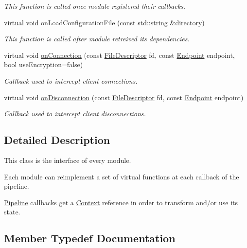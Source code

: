\begin{DoxyCompactItemize}
\begin{DoxyCompactList}\small\item\em This function is called once module registered their callbacks. \end{DoxyCompactList}\item 
virtual void \mbox{\hyperlink{classo_z_1_1_i_module_a61a2cc76594401ed2f50931a6a6b76f3}{on\+Load\+Configuration\+File}} (const std\+::string \&directory)
\begin{DoxyCompactList}\small\item\em This function is called after module retreived its dependencies. \end{DoxyCompactList}\item 
virtual void \mbox{\hyperlink{classo_z_1_1_i_module_a8acf56655f9e59a8a04afd8b0adf79d6}{on\+Connection}} (const \mbox{\hyperlink{namespaceo_z_acbb8d05709257b6414b3979597f88c0c}{File\+Descriptor}} fd, const \mbox{\hyperlink{classo_z_1_1_endpoint}{Endpoint}} endpoint, bool use\+Encryption=false)
\begin{DoxyCompactList}\small\item\em Callback used to intercept client connections. \end{DoxyCompactList}\item 
virtual void \mbox{\hyperlink{classo_z_1_1_i_module_aa178220a4e7ba0cca50a131403e04847}{on\+Disconnection}} (const \mbox{\hyperlink{namespaceo_z_acbb8d05709257b6414b3979597f88c0c}{File\+Descriptor}} fd, const \mbox{\hyperlink{classo_z_1_1_endpoint}{Endpoint}} endpoint)
\begin{DoxyCompactList}\small\item\em Callback used to intercept client disconnections. \end{DoxyCompactList}\end{DoxyCompactItemize}


\subsection{Detailed Description}
This class is the interface of every module. 

Each module can reimplement a set of virtual functions at each callback of the pipeline.

\mbox{\hyperlink{classo_z_1_1_pipeline}{Pipeline}} callbacks get a \mbox{\hyperlink{classo_z_1_1_context}{Context}} reference in order to transform and/or use its state. 

\subsection{Member Typedef Documentation}
\mbox{\label{classo_z_1_1_i_module_ac13210556cb2a65d186bfbe5208c666c}} 
